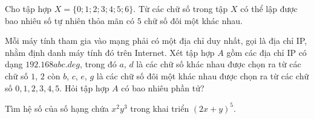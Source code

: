 \TNSA
\begin{ex}%
Cho tập hợp $X=\{0;1;2;3;4;5;6\}$. Từ các chữ số trong tập $X$ có thể lập được bao nhiêu số tự nhiên thỏa mãn có $5$ chữ số đôi một khác nhau.
\end{ex}

\begin{ex}%
Mỗi máy tính tham gia vào mạng phải có một địa chỉ duy nhất, gọi là địa chỉ IP, nhằm định danh máy tính đó trên Internet. Xét tập hợp $A$ gồm các địa chỉ IP có dạng $192$.$168$$ abc$.$deg$, trong đó $a$, $d$ là các chữ số khác nhau được chọn ra từ các chữ số $1$, $2$ còn $b$, $c$, $e$, $g$ là các chữ số đôi một khác nhau được chọn ra từ các chữ số $0,1,2,3,4,5$. Hỏi tập hợp $A$ có bao nhiêu phần tử?
\end{ex}

\begin{ex}%
Tìm hệ số của số hạng chứa $x^2y^3$ trong khai triển $(2x+y)^5$.
\end{ex}

